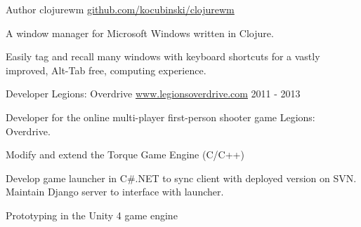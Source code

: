 \documentclass[11pt, letterpaper]{awesome-cv}
\begin{document}
\clearpage
\begin{cventries}
  \cventry
    {Author}
    {clojurewm}
    {\href{https://github.com/kocubinski/clojurewm}{github.com/kocubinski/clojurewm}}
    {}
    {
      \begin{cvitems}
        \item {A window manager for Microsoft Windows written in Clojure.}
        \item {Easily tag and recall many windows with keyboard shortcuts for a vastly improved, Alt-Tab free, computing experience.}
      \end{cvitems}
    }
  \vspace{1mm}
  \cventry
    {Developer}
    {Legions: Overdrive}
    {\href{http://www.legionsoverdrive.com}{www.legionsoverdrive.com}}
    {2011 - 2013}
    {
      \begin{cvitems}
        \item {Developer for the online multi-player first-person shooter game Legions: Overdrive.}
        \item {Modify and extend the Torque Game Engine (C/C++)}
        \item {Develop game launcher in C\#.NET to sync client with deployed version on SVN.  Maintain Django server to interface with launcher.}
        \item {Prototyping in the Unity 4 game engine}
      \end{cvitems}
    }
\end{cventries}


\end{document}
